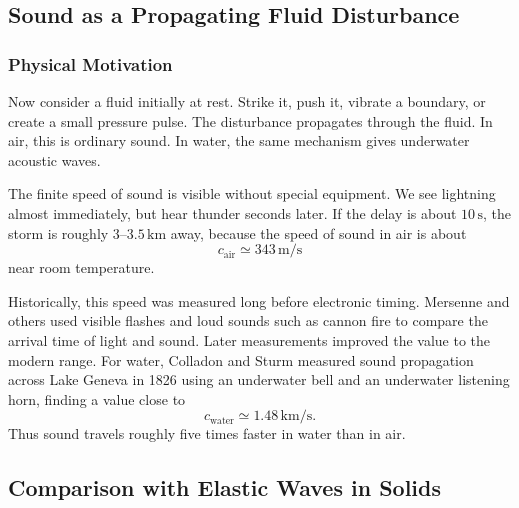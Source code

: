 \documentclass[../main.tex]{subfiles}
\begin{document}
\subsection{Sound as a Propagating Fluid Disturbance}\label{sec:lec22:phenomenology}

\subsubsection*{Physical Motivation}
Now consider a fluid initially at rest. Strike it, push it, vibrate a boundary,
or create a small pressure pulse. The disturbance propagates through the fluid.
In air, this is ordinary sound. In water, the same mechanism gives underwater
acoustic waves.

The finite speed of sound is visible without special equipment. We see lightning
almost immediately, but hear thunder seconds later. If the delay is about
$10\,\mathrm{s}$, the storm is roughly $3$--$3.5\,\mathrm{km}$ away, because the
speed of sound in air is about
\[
  c_{\mathrm{air}}\simeq 343\,\mathrm{m/s}
\]
near room temperature.

Historically, this speed was measured long before electronic timing. Mersenne
and others used visible flashes and loud sounds such as cannon fire to compare
the arrival time of light and sound. Later measurements improved the value to
the modern range. For water, Colladon and Sturm measured sound propagation
across Lake Geneva in 1826 using an underwater bell and an underwater listening
horn, finding a value close to
\[
  c_{\mathrm{water}}\simeq 1.48\,\mathrm{km/s}.
\]
Thus sound travels roughly five times faster in water than in air.

\subsection{Comparison with Elastic Waves in Solids}\label{sec:lec22:solid-comparison}
\end{document}

